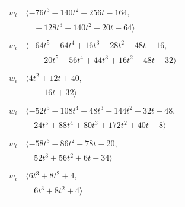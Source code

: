 \documentclass[11pt]{article}
\begin{document}
\begin{longtable}{@{}ll@{}}
$w_i$ & $\langle -76t^{3}-140t^{2}+256t-164,$\\
 & $\quad -128t^{3}+140t^{2}+20t-64\rangle$\\
\addlinespace[2pt]
\multicolumn{2}{@{}p{0.97\textwidth}@{}}{$i=50$, $D_i=2$, $\rho_{ij}$: $11{:}1, \allowbreak 16{:}2, \allowbreak 18{:}1, \allowbreak 21{:}1, \allowbreak 30{:}1, \allowbreak 35{:}2, \allowbreak 42{:}2, \allowbreak 44{:}2, \allowbreak 49{:}1$}\\
$w_i$ & $\langle -64t^{5}-64t^{4}+16t^{3}-28t^{2}-48t-16,$\\
 & $\quad -20t^{5}-56t^{4}+44t^{3}+16t^{2}-48t-32\rangle$\\
\addlinespace[2pt]
\multicolumn{2}{@{}p{0.97\textwidth}@{}}{$i=51$, $D_i=2$, $\rho_{ij}$: $2{:}2, \allowbreak 22{:}1, \allowbreak 29{:}1, \allowbreak 41{:}1, \allowbreak 47{:}2, \allowbreak 55{:}2$}\\
$w_i$ & $\langle 4t^{2}+12t+40,$\\
 & $\quad -16t+32\rangle$\\
\addlinespace[2pt]
\multicolumn{2}{@{}p{0.97\textwidth}@{}}{$i=52$, $D_i=4$, $\rho_{ij}$: $4{:}1, \allowbreak 6{:}2, \allowbreak 7{:}2, \allowbreak 20{:}1, \allowbreak 23{:}2, \allowbreak 25{:}2, \allowbreak 30{:}2, \allowbreak 35{:}1, \allowbreak 36{:}1, \allowbreak 38{:}2, \allowbreak 39{:}1$}\\
$w_i$ & $\langle -52t^{5}-108t^{4}+48t^{3}+144t^{2}-32t-48,$\\
 & $\quad 24t^{5}+88t^{4}+80t^{3}+172t^{2}+40t-8\rangle$\\
\addlinespace[2pt]
\multicolumn{2}{@{}p{0.97\textwidth}@{}}{$i=53$, $D_i=4$, $\rho_{ij}$: $7{:}1, \allowbreak 14{:}2, \allowbreak 15{:}1, \allowbreak 23{:}2, \allowbreak 24{:}1, \allowbreak 25{:}1, \allowbreak 26{:}1, \allowbreak 37{:}2, \allowbreak 40{:}2, \allowbreak 42{:}2, \allowbreak 57{:}2$}\\
$w_i$ & $\langle -58t^{3}-86t^{2}-78t-20,$\\
 & $\quad 52t^{3}+56t^{2}+6t-34\rangle$\\
\addlinespace[2pt]
\multicolumn{2}{@{}p{0.97\textwidth}@{}}{$i=54$, $D_i=4$, $\rho_{ij}$: $18{:}1, \allowbreak 22{:}1, \allowbreak 29{:}2, \allowbreak 43{:}2, \allowbreak 45{:}2, \allowbreak 46{:}1$}\\
$w_i$ & $\langle 6t^{3}+8t^{2}+4,$\\
 & $\quad 6t^{3}+8t^{2}+4\rangle$\\
\addlinespace[2pt]
\multicolumn{2}{@{}p{0.97\textwidth}@{}}{$i=55$, $D_i=16$, $\rho_{ij}$: $9{:}2, \allowbreak 10{:}1, \allowbreak 13{:}1, \allowbreak 14{:}2, \allowbreak 30{:}2, \allowbreak 33{:}2, \allowbreak 35{:}1, \allowbreak 39{:}1, \allowbreak 44{:}1, \allowbreak 51{:}1$}\\

\end{longtable}
\end{document}
